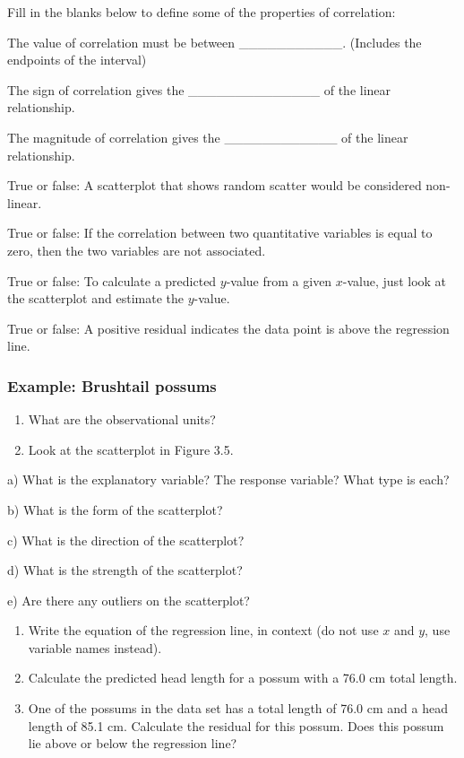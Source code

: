 \documentclass[
]{report}
\newcommand{\rgs}{\vspace{12pt}} %
\newcommand{\rgi}{\hspace{24pt}}  %
\begin{document}
Fill in the blanks below to define some of the properties of correlation:

\rgi The value of correlation must be between \_\_\_\_\_\_\_\_\_\_\_. (Includes the endpoints of the interval)

\rgi The sign of correlation gives the \_\_\_\_\_\_\_\_\_\_\_\_\_\_ of the linear relationship.

\rgi The magnitude of correlation gives the \_\_\_\_\_\_\_\_\_\_\_\_ of the linear relationship.

True or false: A scatterplot that shows random scatter would be considered non-linear.

True or false: If the correlation between two quantitative variables is equal to zero, then the two variables are not associated.

True or false: To calculate a predicted \(y\)-value from a given \(x\)-value, just look at the scatterplot and estimate the \(y\)-value.

True or false: A positive residual indicates the data point is above the regression line.

\newpage

\hypertarget{example-brushtail-possums}{%
\subsubsection*{Example: Brushtail possums}\label{example-brushtail-possums}}

\begin{enumerate}
\def\labelenumi{\arabic{enumi}.}
\item
  What are the observational units?\\
  \rgs
\item
  Look at the scatterplot in Figure 3.5.
\end{enumerate}

\rgi a) What is the explanatory variable? The response variable? What type is each?
\rgs

\rgi b) What is the form of the scatterplot?
\rgs

\rgi c) What is the direction of the scatterplot?
\rgs

\rgi d) What is the strength of the scatterplot?
\rgs

\rgi e) Are there any outliers on the scatterplot?
\rgs

\begin{enumerate}
\def\labelenumi{\arabic{enumi}.}
\setcounter{enumi}{2}
\item
  Write the equation of the regression line, in context (do not use \(x\) and \(y\), use variable names instead).
  \rgs
\item
  Calculate the predicted head length for a possum with a 76.0 cm total length.
  \rgs
\item
  One of the possums in the data set has a total length of 76.0 cm and a head length of 85.1 cm. Calculate the residual for this possum. Does this possum lie above or below the regression line?
  \rgs
\end{enumerate}
\end{document}

